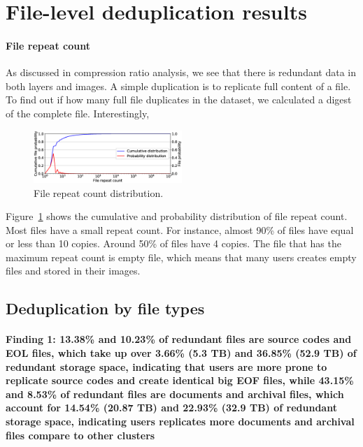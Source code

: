 \section{File-level deduplication results}
\label{sec:redundant_files}




\paragraph{File repeat count}

As discussed in compression ratio analysis, we see that there is redundant data in both layers and images.
A simple duplication is to replicate full content of a file. To find out if how many full file duplicates in the dataset, we calculated a digest of the complete file. 
Interestingly,

\begin{figure}
	\centering
	\includegraphics[width=0.5\textwidth]{graphs/File_repeat_count.eps}
	\caption{File repeat count distribution.
	}
	\label{fig:file-repeat-cnt}
\end{figure}

Figure~\ref{fig:file-repeat-cnt} shows the cumulative and probability distribution of file repeat count. 
Most files have a small repeat count. For instance, almost 90\% of files have equal or less than 10 copies. Around 50\% of files have 4 copies.
The file that has the maximum repeat count is empty file, which means that many users creates empty files and stored in their images.

\subsection{Deduplication by file types}

\paragraph{Finding 1: 13.38\% and 10.23\% of redundant files are source codes and EOL files, which take up over 3.66\% (5.3 TB) and 36.85\% (52.9 TB) of redundant storage space, indicating that users are more prone to replicate source codes and create identical big EOF files, while 43.15\% and 8.53\% of redundant files are documents and archival files, which account for 14.54\% (20.87 TB) and 22.93\% (32.9 TB) of redundant storage space, indicating users replicates more documents and archival files compare to other clusters}

